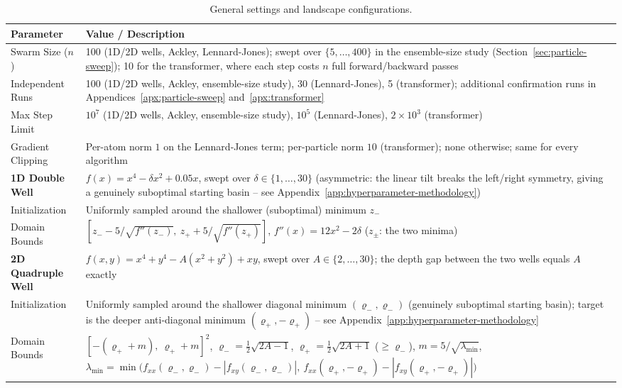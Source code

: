 \documentclass{article}
\theoremstyle{plain}
\theoremstyle{definition}
\theoremstyle{remark}
\begin{document}
\begin{table}[!htbp]
\centering
\caption{General settings and landscape configurations.}
\label{tab:general_settings}
\small
\begin{tabular}{@{}lp{}@{}}
\toprule
\textbf{Parameter} & \textbf{Value / Description} \\
\midrule
Swarm Size ($n$) & 100 (1D/2D wells, Ackley, Lennard-Jones); swept over $\{5,\dots,400\}$ in the ensemble-size study (Section~\ref{sec:particle-sweep}); 10 for the transformer, where each step costs $n$ full forward/backward passes \\
Independent Runs & 100 (1D/2D wells, Ackley, ensemble-size study), 30 (Lennard-Jones), 5 (transformer); additional confirmation runs in Appendices~\ref{apx:particle-sweep} and~\ref{apx:transformer} \\
Max Step Limit & $10^7$ (1D/2D wells, Ackley, ensemble-size study), $10^5$ (Lennard-Jones), $2\times10^3$ (transformer) \\
Gradient Clipping & Per-atom norm $1$ on the Lennard-Jones term; per-particle norm $10$ (transformer); none otherwise; same for every algorithm \\
\midrule
\textbf{1D Double Well} & $f(x) = x^4 - \delta x^2 + 0.05x$, swept over $\delta\in\{1,\dots,30\}$ (asymmetric: the linear tilt breaks the left/right symmetry, giving a genuinely suboptimal starting basin -- see Appendix~\ref{app:hyperparameter-methodology}) \\
Initialization & Uniformly sampled around the shallower (suboptimal) minimum $z_-$ \\
Domain Bounds & $[z_- - 5/\sqrt{f''(z_-)},\ z_+ + 5/\sqrt{f''(z_+)}]$, $f''(x)=12x^2-2\delta$ ($z_\pm$: the two minima) \\
\midrule
\textbf{2D Quadruple Well} & $f(x,y) = x^4 + y^4 - A(x^2 + y^2) + xy$, swept over $A\in\{2,\dots,30\}$; the depth gap between the two wells equals $A$ exactly \\
Initialization & Uniformly sampled around the shallower diagonal minimum $(\varrho_-,\varrho_-)$ (genuinely suboptimal starting basin); target is the deeper anti-diagonal minimum $(\varrho_+,-\varrho_+)$ -- see Appendix~\ref{app:hyperparameter-methodology} \\
Domain Bounds & $[-(\varrho_++m),\ \varrho_++m]^2$, $\varrho_-=\tfrac12\sqrt{2A-1}$, $\varrho_+=\tfrac12\sqrt{2A+1}$ ($\geq\varrho_-$), $m=5/\sqrt{\lambda_{\min}}$, $\lambda_{\min}=\min\big(f_{xx}(\varrho_-,\varrho_-)-|f_{xy}(\varrho_-,\varrho_-)|,\ f_{xx}(\varrho_+,-\varrho_+)-|f_{xy}(\varrho_+,-\varrho_+)|\big)$ \\

\end{tabular}
\end{table}
\end{document}
